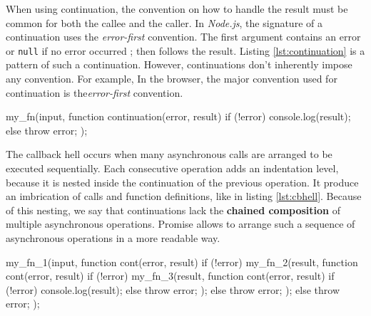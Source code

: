 When using continuation, the convention on how to handle the result must be common for both the callee and the caller.
In \textit{Node.js}, the signature of a continuation uses the \textit{error-first} convention.
The first argument contains an error or \texttt{null} if no error occurred ; then follows the result.
Listing \ref{lst:continuation} is a pattern of such a continuation.
However, continuations don't inherently impose any convention.
For example, In the browser, the major convention used for continuation is the\textit{error-first} convention.

\begin{code}[js, %
             caption={Example of a continuation}, %
             label={lst:continuation}] %
my_fn(input, function continuation(error, result) {
  if (!error) {
    console.log(result);
  } else {
    throw error;
  }
});
\end{code}

The callback hell occurs when many asynchronous calls are arranged to be executed sequentially.
Each consecutive operation adds an indentation level, because it is nested inside the continuation of the previous operation.
It produce an imbrication of calls and function definitions, like in listing \ref{lst:cbhell}.
Because of this nesting, we say that continuations lack the \textbf{chained composition} of multiple asynchronous operations.
Promise allows to arrange such a sequence of asynchronous operations in a more readable way.


\begin{code}[js, %
             caption={Example of a sequence of continuations}, %
             label={lst:cbhell}] %
my_fn_1(input, function cont(error, result) {
  if (!error) {
    my_fn_2(result, function cont(error, result) {
      if (!error) {
        my_fn_3(result, function cont(error, result) {
          if (!error) {
            console.log(result);
          } else {
            throw error;
          }
        });
      } else {
        throw error;
      }
    });
  } else {
    throw error;
  }
});
\end{code}

